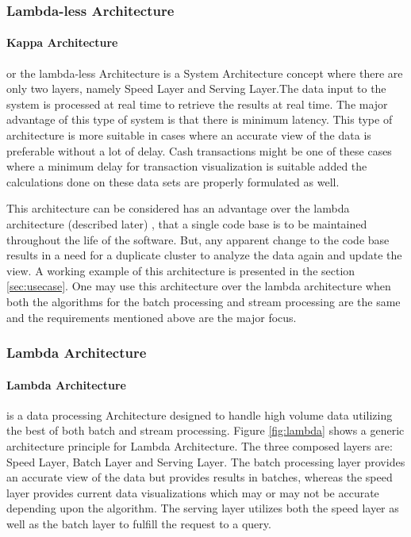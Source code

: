 \documentclass[runningheads,a4paper]{llncs}[2015/06/24]
\begin{document}
\subsubsection{Lambda-less Architecture}
\paragraph{Kappa Architecture} or the lambda-less Architecture is a System Architecture concept where there are only two layers, namely Speed Layer and Serving Layer.The data input to the system is processed at real time to retrieve the results at real time. The major advantage of this type of system is that there is minimum latency. This type of architecture is more suitable in cases where an accurate view of the data is preferable without a lot of delay. Cash transactions might be one of these cases where a minimum delay for transaction visualization is suitable added the calculations done on these data sets are properly formulated as well.

This architecture can be considered has an advantage over the lambda architecture (described later) , that a single code base is to be maintained throughout the life of the software. But, any apparent change to the code base results in a need for a duplicate cluster to analyze the data again and update the view. A working example of this architecture is presented in the section \ref{sec:usecase}. One may use this architecture over the lambda architecture when both the algorithms for the batch processing and stream processing are the same and the requirements mentioned above are the major focus.

\subsubsection{Lambda Architecture}
\paragraph{Lambda Architecture} is a data processing Architecture designed to handle high volume data utilizing the best of both batch and stream processing. Figure \ref{fig:lambda} shows a generic architecture principle for Lambda Architecture. The three composed layers are: Speed Layer, Batch Layer and Serving Layer. The batch processing layer provides an accurate view of the data but provides results in batches, whereas the speed layer provides current data visualizations which may or may not be accurate depending upon the algorithm. The serving layer utilizes both the speed layer as well as the batch layer to fulfill the request to a query.
\end{document}
